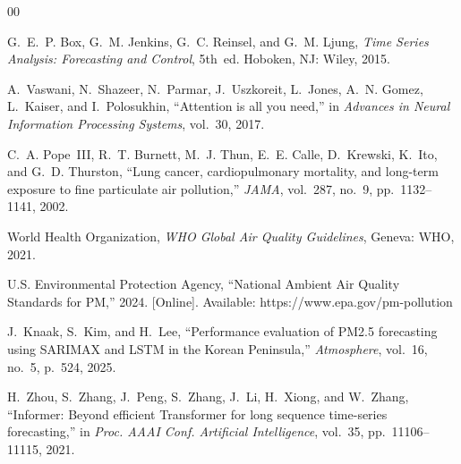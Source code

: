 \documentclass[conference]{IEEEtran}
\begin{document}
\begin{thebibliography}{00}

G.~E.~P. Box, G.~M. Jenkins, G.~C. Reinsel, and G.~M. Ljung,
\textit{Time Series Analysis: Forecasting and Control}, 5th~ed.
Hoboken, NJ: Wiley, 2015.

A.~Vaswani, N.~Shazeer, N.~Parmar, J.~Uszkoreit, L.~Jones, A.~N. Gomez, L.~Kaiser, and I.~Polosukhin,
``Attention is all you need,''
in \textit{Advances in Neural Information Processing Systems}, vol.~30, 2017.

C.~A. Pope~III, R.~T. Burnett, M.~J. Thun, E.~E. Calle, D.~Krewski, K.~Ito, and G.~D. Thurston,
``Lung cancer, cardiopulmonary mortality, and long-term exposure to fine particulate air pollution,''
\textit{JAMA}, vol.~287, no.~9, pp.~1132--1141, 2002.

World Health Organization,
\textit{WHO Global Air Quality Guidelines},
Geneva: WHO, 2021.

U.S. Environmental Protection Agency,
``National Ambient Air Quality Standards for PM,''
2024. [Online]. Available: https://www.epa.gov/pm-pollution

J.~Knaak, S.~Kim, and H.~Lee,
``Performance evaluation of PM2.5 forecasting using SARIMAX and LSTM in the Korean Peninsula,''
\textit{Atmosphere}, vol.~16, no.~5, p.~524, 2025.

H.~Zhou, S.~Zhang, J.~Peng, S.~Zhang, J.~Li, H.~Xiong, and W.~Zhang,
``Informer: Beyond efficient Transformer for long sequence time-series forecasting,''
in \textit{Proc. AAAI Conf. Artificial Intelligence}, vol.~35, pp.~11106--11115, 2021.

\end{thebibliography}
\end{document}
